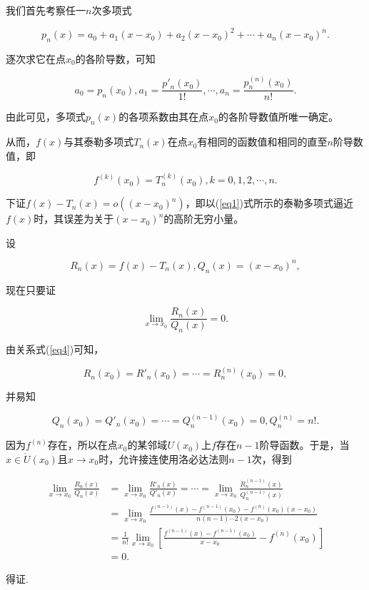 \documentclass{ctexart}
\begin{document}
我们首先考察任一$n$次多项式

\begin{equation}\label{eq3}
	p_n(x)=a_0+a_1(x-x_0)+a_2(x-x_0)^2+\cdots+a_n(x-x_0)^n.
\end{equation}

逐次求它在点$x_0$的各阶导数，可知

$$a_0=p_n(x_0),a_1=\displaystyle\frac{p'_n(x_0)}{1!},\cdots,a_n=\displaystyle\frac{p_n^{(n)}(x_0)}{n!}.$$

由此可见，多项式$p_n(x)$的各项系数由其在点$x_0$的各阶导数值所唯一确定。

从而，$f(x)$与其泰勒多项式$T_n(x)$在点$x_0$有相同的函数值和相同的直至$n$阶导数值，即

\begin{equation}\label{eq4}
	f^{(k)}(x_0)=T_n^{(k)}(x_0),k=0,1,2,\cdots,n.
\end{equation}

下证$f(x)-T_n(x)=o((x-x_0)^n)$，即以(\ref{eq1})式所示的泰勒多项式逼近$f(x)$时，其误差为关于$(x-x_0)^n$的高阶无穷小量。

设

\begin{equation}\label{eq5}
	R_n(x)=f(x)-T_n(x),Q_n(x)=(x-x_0)^n,
\end{equation}

现在只要证

\begin{equation}\label{eq6}
	\lim\limits_{x\rightarrow x_0}\displaystyle\frac{R_n(x)}{Q_n(x)}=0.
\end{equation}

由关系式(\ref{eq4})可知，

$$R_n(x_0)=R'_n(x_0)=\cdots=R_n^{(n)}(x_0)=0,$$

并易知

$$Q_n(x_0)=Q'_n(x_0)=\cdots=Q_n^{(n-1)}(x_0)=0,Q_n^{(n)}=n!.$$

因为$f^{(n)}$存在，所以在点$x_0$的某邻域$U(x_0)$上$f$存在$n-1$阶导函数。于是，当$x\in \mathring{U}(x_0)$且$x\rightarrow x_0$时，允许接连使用洛必达法则$n-1$次，得到

\begin{equation}\label{eq7}
	\begin{aligned}
		\lim\limits_{x\rightarrow x_0}\displaystyle\frac{R_n(x)}{Q_n(x)} & =\lim\limits_{x\rightarrow x_0}\displaystyle\frac{R'_n(x)}{Q'_n(x)}=\cdots=\lim\limits_{x\rightarrow x_0}\displaystyle\frac{R_n^{(n-1)}(x)}{Q_n^{(n-1)}(x)}\\
		& =\lim\limits_{x\rightarrow x_0}\displaystyle\frac{f^{(n-1)}(x)-f^{(n-1)}(x_0)-f^{(n)}(x_0)(x-x_0)}{n(n-1)\cdots 2(x-x_0)}\\
		& =\displaystyle\frac{1}{n!}\lim\limits_{x\rightarrow x_0}\left[\displaystyle\frac{f^{(n-1)}(x)-f^{(n-1)}(x_0)}{x-x_0}-f^{(n)}(x_0)\right]\\
		& =0.
	\end{aligned}
\end{equation}

得证.
\end{document}
